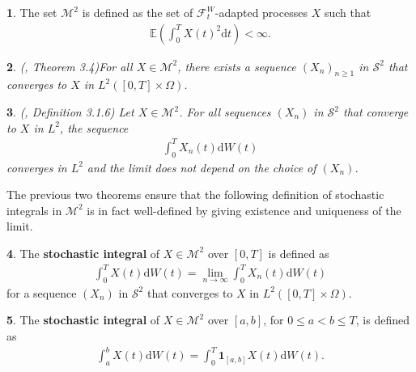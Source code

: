 \documentclass[english]{article}
\newcommand{\comment}[1]{\color{blue}#1\color{black}}
\numberwithin{equation}{section}
\numberwithin{figure}{section}
\theoremstyle{bolddescit}
\newtheorem{theorem}{\protect\theoremname}[section]
\theoremstyle{definition}
\newtheorem{definition}[theorem]{\protect\definitionname}
\theoremstyle{definition}
\theoremstyle{plain}
\theoremstyle{plain}
\theoremstyle{bolddesc}
\theoremstyle{plain}
\theoremstyle{remark}
\providecommand{\definitionname}{Definition}
\providecommand{\theoremname}{Theorem}
\begin{document}
\begin{definition}
  The set $\mathcal{M}^2$ is defined as the set of $\mathcal{F}^W_t$-adapted processes $X$ such that
  \begin{align*}
    \mathbb{E}\left(\int_0^T X(t)^2 \mathrm{d}t \right) < \infty.
  \end{align*}
\end{definition}

\begin{theorem}
(\cite{capinski_stochastic_2012}, Theorem 3.4)\label{thm:s2-m2-conv}
  For all $X \in \mathcal{M}^2$, there exists a sequence $(X_n)_{n \ge 1}$ in $\mathcal{S}^2$ that converges to $X$ in $L^2([0,T] \times \Omega)$.
\end{theorem}

\begin{theorem}
  (\cite{oksendal_stochastic_2003}, Definition 3.1.6)
  Let $X \in \mathcal{M}^2$. For all sequences $(X_n)$ in $\mathcal{S}^2$ that converge to $X$ in $L^2$, the sequence
  \begin{align*}
    \int_0^T X_n(t) \mathrm{d}W(t)
  \end{align*}
  converges in $L^2$ and the limit does not depend on the choice of $(X_n)$.
\end{theorem}

The previous two theorems ensure that the following definition of stochastic integrals in $\mathcal{M}^2$ is in fact well-defined by giving existence and uniqueness of the limit.

\begin{definition}
  The \textbf{stochastic integral} of $X \in \mathcal{M}^2$ over $[0,T]$ is defined as
  \begin{align*}
    \int_0^T X(t) \mathrm{d}W(t) = \lim_{n \to \infty} \int_0^T X_n(t) \mathrm{d}W(t)
  \end{align*}
  for a sequence $(X_n)$ in $\mathcal{S}^2$ that converges to $X$ in $L^2([0,T] \times \Omega)$.
\end{definition}

\begin{definition}
  The \textbf{stochastic integral} of $X \in \mathcal{M}^2$ over $[a,b]$, for $0 \le a < b \le T$, is defined as
  \begin{align*}
    \int_a^b X(t) \mathrm{d}W(t)
    = \int_0^T \mathbf{1}_{[a,b]} X(t) \mathrm{d}W(t).
  \end{align*}
\end{definition}
\end{document}
